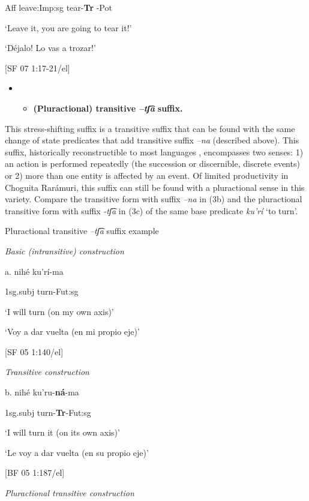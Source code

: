 Aff  leave:Imp:sg  tear-\textbf{Tr}  {}-Pot

    ‘Leave it, you are going to tear it!’

    ‘Déjalo! Lo vas a trozar!’        

    [SF 07 1:17-21/el]

\begin{itemize}
\item \begin{itemize}
\item \textbf{(Pluractional) transitive \textit{–}}\textbf{\textit{tʃ͡}}\textbf{\textit{a} }\textbf{suffix.}
\end{itemize}
\end{itemize}

This stress-shifting suffix is a transitive suffix that can be found with the same change of state predicates that add transitive suffix \textit{–na} (described above). This suffix, historically reconstructible to most  languages \citep{heath1978uto}, encompasses two senses: 1) an action is performed repeatedly (the succession or discernible, discrete events) or 2) more than one entity is affected by an event. Of limited productivity in Choguita Rarámuri, this suffix can still be found with a pluractional sense in this variety. Compare the transitive form with suffix \textit{–na} in (3b) and the pluractional transitive form with suffix \textit{{}-tʃ͡a} in (3c) of the same base predicate \textit{ku’rí} ‘to turn’. 

   Pluractional transitive \textit{–tʃ͡a} suffix example

  \textit{Basic (intransitive) construction}

a.   nihé  ku’rí-ma

  1sg.subj  turn-Fut:sg  

‘I will turn (on my own axis)’    

‘Voy a dar vuelta (en mi propio eje)’       

[SF 05 1:140/el]

    \textit{Transitive construction}

b.  nihé   ku’ru-\textbf{ná}{}-ma  

1sg.subj   turn-\textbf{Tr}{}-Fut:sg      

‘I will turn it (on its own axis)’  

‘Le voy a dar vuelta (en su propio eje)’    

[BF 05 1:187/el]

    \textit{Pluractional transitive construction}

